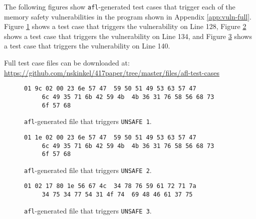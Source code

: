 \begin{appendices}
The following figures show \texttt{afl}-generated test cases that trigger each
of the memory safety vulnerabilities in the program shown in Appendix
\ref{app:vuln-full}. Figure \ref{fig:crash1} shows a test
case that triggers the vulnerability on Line 128, Figure
\ref{fig:crash2} shows a test case that triggers the vulnerability on Line 134,
and Figure \ref{fig:crash3} shows a test case that triggers the vulnerability
on Line 140.

Full test case files can be downloaded at: \url{https://github.com/nskinkel/417paper/tree/master/files/afl-test-cases}

\begin{figure}
	\begin{lstlisting}[language={},basicstyle=\small]
     01 9c 02 00 23 6e 57 47  59 50 51 49 53 63 57 47
     6c 49 35 71 6b 42 59 4b  4b 36 31 76 58 56 68 73
     6f 57 68\end{lstlisting}
\caption{\texttt{afl}-generated file that triggers \texttt{UNSAFE 1}.}
\label{fig:crash1}
\end{figure}

\begin{figure}
	\begin{lstlisting}[language={},basicstyle=\small]
	 01 1e 02 00 23 6e 57 47  59 50 51 49 53 63 57 47
	 6c 49 35 71 6b 42 59 4b  4b 36 31 76 58 56 68 73
	 6f 57 68\end{lstlisting}
\caption{\texttt{afl}-generated file that triggers \texttt{UNSAFE 2}.}
\label{fig:crash2}
\end{figure}

\begin{figure}
	\begin{lstlisting}[language={},basicstyle=\small]
	 01 02 17 80 1e 56 67 4c  34 78 76 59 61 72 71 7a
	 34 75 34 77 54 31 4f 74  69 48 46 61 37 75\end{lstlisting}
\caption{\texttt{afl}-generated file that triggers \texttt{UNSAFE 3}.}
\label{fig:crash3}
\end{figure}

\end{appendices}
